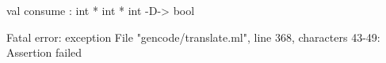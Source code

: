 \chklistingfalse
{}
\begin{ChkListingMsg}
val consume : int * int * int -D-> bool 
\end{ChkListingMsg}
\begin{ChkListingErr}
Fatal error: exception File "gencode/translate.ml", line 368, characters 43-49: Assertion failed
\end{ChkListingErr}
